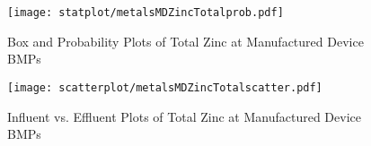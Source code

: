         \begin{figure}[hb]   %
            \centering
            \texttt{[image: statplot/metalsMDZincTotalprob.pdf]}
            \caption{Box and Probability Plots of Total Zinc at Manufactured Device BMPs}
        \end{figure}         %
        
        
        \begin{figure}[hb]   %
            \centering
            \texttt{[image: scatterplot/metalsMDZincTotalscatter.pdf]}
            \caption{Influent vs. Effluent Plots of Total Zinc at Manufactured Device BMPs}
        \end{figure}         %
        \clearpage
        